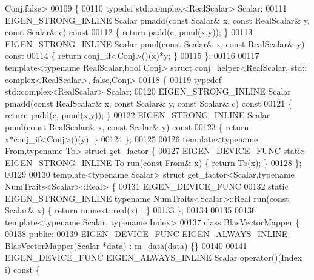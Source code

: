 \begin{DoxyCode}
      Conj,false>
00109 \{
00110   \textcolor{keyword}{typedef} std::complex<RealScalar> Scalar;
00111   EIGEN\_STRONG\_INLINE Scalar pmadd(\textcolor{keyword}{const} Scalar& x, \textcolor{keyword}{const} RealScalar& y, \textcolor{keyword}{const} Scalar& c)\textcolor{keyword}{ const}
00112 \textcolor{keyword}{  }\{ \textcolor{keywordflow}{return} padd(c, pmul(x,y)); \}
00113   EIGEN\_STRONG\_INLINE Scalar pmul(\textcolor{keyword}{const} Scalar& x, \textcolor{keyword}{const} RealScalar& y)\textcolor{keyword}{ const}
00114 \textcolor{keyword}{  }\{ \textcolor{keywordflow}{return} conj\_if<Conj>()(x)*y; \}
00115 \};
00116 
00117 \textcolor{keyword}{template}<\textcolor{keyword}{typename} RealScalar,\textcolor{keywordtype}{bool} Conj> \textcolor{keyword}{struct }conj\_helper<RealScalar, \hyperlink{namespacestd}{std}::
      \hyperlink{structcomplex}{complex}<RealScalar>, false,Conj>
00118 \{
00119   \textcolor{keyword}{typedef} std::complex<RealScalar> Scalar;
00120   EIGEN\_STRONG\_INLINE Scalar pmadd(\textcolor{keyword}{const} RealScalar& x, \textcolor{keyword}{const} Scalar& y, \textcolor{keyword}{const} Scalar& c)\textcolor{keyword}{ const}
00121 \textcolor{keyword}{  }\{ \textcolor{keywordflow}{return} padd(c, pmul(x,y)); \}
00122   EIGEN\_STRONG\_INLINE Scalar pmul(\textcolor{keyword}{const} RealScalar& x, \textcolor{keyword}{const} Scalar& y)\textcolor{keyword}{ const}
00123 \textcolor{keyword}{  }\{ \textcolor{keywordflow}{return} x*conj\_if<Conj>()(y); \}
00124 \};
00125 
00126 \textcolor{keyword}{template}<\textcolor{keyword}{typename} From,\textcolor{keyword}{typename} To> \textcolor{keyword}{struct }get\_factor \{
00127   EIGEN\_DEVICE\_FUNC \textcolor{keyword}{static} EIGEN\_STRONG\_INLINE To run(\textcolor{keyword}{const} From& x) \{ \textcolor{keywordflow}{return} To(x); \}
00128 \};
00129 
00130 \textcolor{keyword}{template}<\textcolor{keyword}{typename} Scalar> \textcolor{keyword}{struct }get\_factor<Scalar,typename NumTraits<Scalar>::Real> \{
00131   EIGEN\_DEVICE\_FUNC
00132   \textcolor{keyword}{static} EIGEN\_STRONG\_INLINE \textcolor{keyword}{typename} NumTraits<Scalar>::Real run(\textcolor{keyword}{const} Scalar& x) \{ \textcolor{keywordflow}{return} numext::real(x)
      ; \}
00133 \};
00134 
00135 
00136 \textcolor{keyword}{template}<\textcolor{keyword}{typename} Scalar, \textcolor{keyword}{typename} Index>
00137 \textcolor{keyword}{class }BlasVectorMapper \{
00138   \textcolor{keyword}{public}:
00139   EIGEN\_DEVICE\_FUNC EIGEN\_ALWAYS\_INLINE BlasVectorMapper(Scalar *data) : m\_data(data) \{\}
00140 
00141   EIGEN\_DEVICE\_FUNC EIGEN\_ALWAYS\_INLINE Scalar operator()(Index i)\textcolor{keyword}{ const }\{

\end{DoxyCode}
